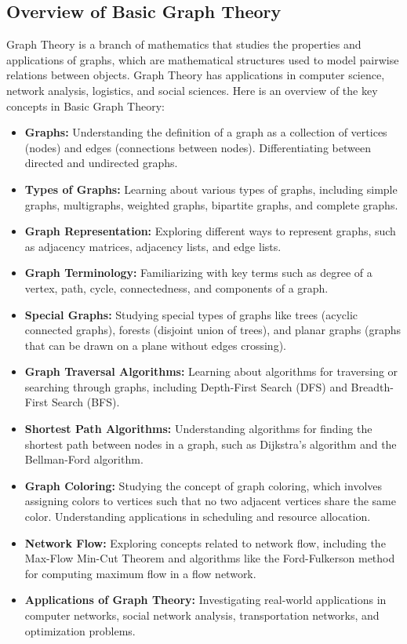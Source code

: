\documentclass[openany]{book}
\begin{document}
\subsection{Overview of Basic Graph Theory}
Graph Theory is a branch of mathematics that studies the properties and applications of graphs, which are mathematical structures used to model pairwise relations between objects. Graph Theory has applications in computer science, network analysis, logistics, and social sciences. Here is an overview of the key concepts in Basic Graph Theory:
\begin{itemize}
    \item \textbf{Graphs:} Understanding the definition of a graph as a collection of vertices (nodes) and edges (connections between nodes). Differentiating between directed and undirected graphs.
    \item \textbf{Types of Graphs:} Learning about various types of graphs, including simple graphs, multigraphs, weighted graphs, bipartite graphs, and complete graphs.
    \item \textbf{Graph Representation:} Exploring different ways to represent graphs, such as adjacency matrices, adjacency lists, and edge lists.
    \item \textbf{Graph Terminology:} Familiarizing with key terms such as degree of a vertex, path, cycle, connectedness, and components of a graph.
    \item \textbf{Special Graphs:} Studying special types of graphs like trees (acyclic connected graphs), forests (disjoint union of trees), and planar graphs (graphs that can be drawn on a plane without edges crossing).
    \item \textbf{Graph Traversal Algorithms:} Learning about algorithms for traversing or searching through graphs, including Depth-First Search (DFS) and Breadth-First Search (BFS).
    \item \textbf{Shortest Path Algorithms:} Understanding algorithms for finding the shortest path between nodes in a graph, such as Dijkstra's algorithm and the Bellman-Ford algorithm.
    \item \textbf{Graph Coloring:} Studying the concept of graph coloring, which involves assigning colors to vertices such that no two adjacent vertices share the same color. Understanding applications in scheduling and resource allocation.
    \item \textbf{Network Flow:} Exploring concepts related to network flow, including the Max-Flow Min-Cut Theorem and algorithms like the Ford-Fulkerson method for computing maximum flow in a flow network.
    \item \textbf{Applications of Graph Theory:} Investigating real-world applications in computer networks, social network analysis, transportation networks, and optimization problems.
\end{itemize}
\end{document}
